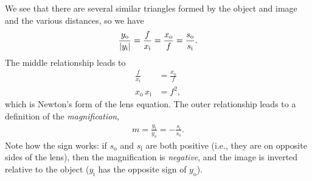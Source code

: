 \documentclass[]{manual}
\begin{document}
    We see that there are several similar triangles formed by the object and image and the various distances, so we have
    \begin{align}
        \frac{y_{\mathrm{o}}}{\abs{y_{\mathrm{i}}}} = \frac{f}{x_{\mathrm{i}}} = \frac{x_{\mathrm{o}}}{f} = \frac{s_{\mathrm{o}}}{s_{\mathrm{i}}}.
    \end{align}
    The middle relationship leads to
    \begin{align}
        \frac{f}{x_{\mathrm{i}}} &= \frac{x_{\mathrm{o}}}{f} \nonumber \\
        x_{\mathrm{o}} \, x_{\mathrm{i}} &= f^2,
    \end{align}
    which is Newton's form of the lens equation.
    The outer relationship leads to a definition of the \emph{magnification},
    \begin{align} \label{eqn:magnification}
        m = \frac{y_{\mathrm{i}}}{y_{\mathrm{o}}} = - \frac{s_{\mathrm{i}}}{s_{\mathrm{o}}}.
    \end{align}
    Note how the sign works: if $s_{\mathrm{o}}$ and $s_{\mathrm{i}}$ are both positive (i.e., they are on opposite sides of the lens), then the magnification is \textit{negative}, and the image is inverted relative to the object ($y_{\mathrm{i}}$ has the opposite sign of $y_{\mathrm{o}}$). 
   
\end{document}
